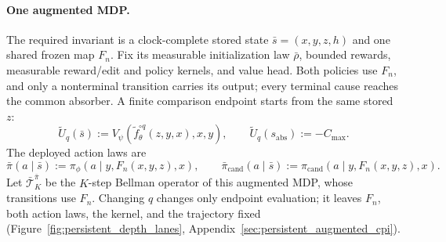 \documentclass{article}
\theoremstyle{plain}
\theoremstyle{definition}
\theoremstyle{remark}
\begin{document}
\paragraph{One augmented MDP.}
The required invariant is a clock-complete stored state
$\bar s=(x,y,z,h)$ and one shared frozen map $F_n$. Fix its measurable
initialization law $\bar\rho$, bounded rewards, measurable reward/edit and
policy kernels, and value head. Both policies use $F_n$, and only a nonterminal transition
carries its output; every terminal cause reaches the common absorber. A finite
comparison endpoint starts from the same stored $z$:
\begin{equation}
\widetilde U_q(\bar s):=
V_\psi(\widetilde f_\theta^{\circ q}(z,y,x),x,y),
\qquad
\widetilde U_q(s_{\mathrm{abs}}):=-C_{\max}.
\label{eq:persistent_un_value}
\end{equation}
The deployed action laws are
\begin{equation}
\bar\pi(a\mid\bar s):=\pi_\phi(a\mid y,F_n(x,y,z),x),
\qquad
\bar\pi_{\mathrm{cand}}(a\mid\bar s):=\pi_{\mathrm{cand}}(a\mid y,F_n(x,y,z),x).
\label{eq:augmented_policies_main}
\end{equation}
Let $\bar{\mathcal T}^{\bar\pi}_K$ be the $K$-step Bellman operator of this
augmented MDP, whose transitions use $F_n$.
Changing $q$ changes only endpoint evaluation; it leaves $F_n$, both action
laws, the kernel, and the trajectory fixed
(Figure~\ref{fig:persistent_depth_lanes}, Appendix~\ref{sec:persistent_augmented_cpi}).
\end{document}
